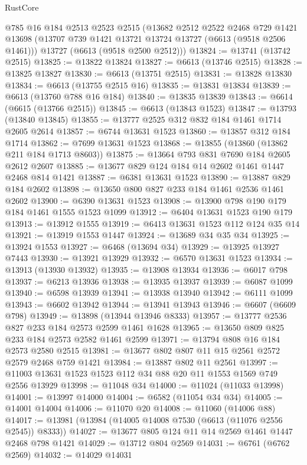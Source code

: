 \begin{lexlean}{RustCore}
\begin{coremodule}
    @785
    @16
    @184
    @2513
    @2523
    @2515
    (@13682
      @2512
      @2522
      @2468
      @729
      @1421
      @13698
      (@13707 @739 @1421 @13721 @13724 @13727 (@6613 (@9518 @2506 @1461)))
      @13727
      (@6613 (@9518 @2500 @2512)))
@13824 := @13741 (@13742 @2515)
@13825 := @13822 @13824
@13827 := @6613 (@13746 @2515)
@13828 := @13825 @13827
@13830 := @6613 (@13751 @2515)
@13831 := @13828 @13830
@13834 := @6613 (@13755 @2515 @16)
@13835 := @13831 @13834
@13839 := @6613 (@13760 @788 @16 @184)
@13840 := @13835 @13839
@13843 := @6614 (@6615 (@13766 @2515))
@13845 := @6613 (@13843 @1523)
@13847 := @13793 (@13840 @13845)
@13855 := @13777 @2525 @312 @832 @184 @1461 @1714 @2605 @2614
@13857 := @6744 @13631 @1523
@13860 := @13857 @312 @184 @1714
@13862 := @7699 @13631 @1523
@13868 := @13855 (@13860 (@13862 @211 @184 @1713 @8603))
@13875 := @13664 @793 @831 @7690 @184 @2605 @2612 @2607
@13885 := @13677 @829 @124 @184 @14 @2602 @1461 @1447 @2468 @814 @1421
@13887 := @6381 @13631 @1523
@13890 := @13887 @829 @184 @2602
@13898 := @13650 @800 @827 @233 @184 @1461 @2536 @1461 @2602
@13900 := @6390 @13631 @1523
@13908 := @13900 @798 @190 @179 @184 @1461 @1555 @1523 @1099
@13912 := @6404 @13631 @1523 @190 @179
@13913 := @13912 @1555
@13919 := @6413 @13631 @1523 @112 @124 @35 @14
@13921 := @13919 @1553 @1447
@13924 := @13689 @34 @35 @34
@13925 := @13924 @1553
@13927 := @6468 (@13694 @34)
@13929 := @13925 @13927 @7443
@13930 := @13921 @13929
@13932 := @6570 @13631 @1523
@13934 := @13913 (@13930 @13932)
@13935 := @13908 @13934
@13936 := @6017 @798
@13937 := @6213 @13936
@13938 := @13935 @13937
@13939 := @6087 @1099
@13940 := @6598 @13939
@13941 := @13938 @13940
@13942 := @6111 @1099
@13943 := @6602 @13942
@13944 := @13941 @13943
@13946 := @6607 (@6609 @798)
@13949 := @13898 (@13944 @13946 @8333)
@13957 := @13777 @2536 @827 @233 @184 @2573 @2599 @1461 @1628
@13965 := @13650 @809 @825 @233 @184 @2573 @2582 @1461 @2599
@13971 := @13794 @808 @16 @184 @2573 @2580 @2515
@13981 := @13677 @802 @807 @11 @15 @2561 @2572 @2579 @2468 @759 @1421
@13984 := @13887 @802 @11 @2561
@13997 := @11003 @13631 @1523 @1523 @112 @34 @88 @20 @11 @1553 @1569 @749 @2556 @13929
@13998 := @11048 @34
@14000 := @11024 (@11033 @13998)
@14001 := @13997 @14000
@14004 := @6582 (@11054 @34 @34)
@14005 := @14001 @14004
@14006 := @11070 @20
@14008 := @11060 (@14006 @88)
@14017 := @13981 (@13984 (@14005 @14008 @7530 (@6613 (@11076 @2556 @2545)) @8333))
@14027 := @13677 @805 @124 @11 @14 @2569 @1461 @1447 @2468 @798 @1421
@14029 := @13712 @804 @2569
@14031 := @6761 (@6762 @2569)
@14032 := @14029 @14031

\end{coremodule}
\end{lexlean}
